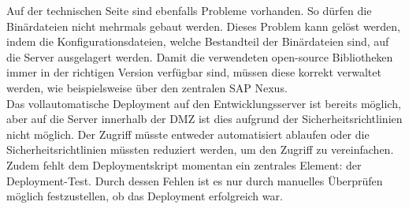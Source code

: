  Auf der technischen Seite sind ebenfalls Probleme vorhanden. So dürfen die Binärdateien nicht mehrmals gebaut werden. Dieses Problem kann gelöst werden, indem die Konfigurationsdateien, welche Bestandteil der Binärdateien sind, auf die Server ausgelagert werden. Damit die verwendeten open-source Bibliotheken immer in der richtigen Version verfügbar sind, müssen diese korrekt verwaltet werden, wie beispielsweise über den zentralen SAP Nexus. \\
Das vollautomatische Deployment auf den Entwicklungsserver ist bereits möglich, aber auf die Server innerhalb der \acs{DMZ} ist dies aufgrund der Sicherheitsrichtlinien nicht möglich. Der Zugriff müsste entweder automatisiert ablaufen oder die Sicherheitsrichtlinien müssten reduziert werden, um den Zugriff zu vereinfachen. Zudem fehlt dem Deploymentskript momentan ein zentrales Element: der Deployment-Test. Durch dessen Fehlen ist es nur durch manuelles Überprüfen möglich festzustellen, ob das Deployment erfolgreich war.